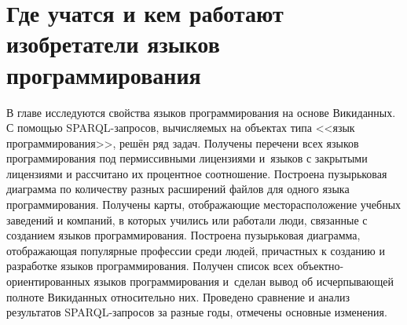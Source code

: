 \chapter{Где учатся и кем работают изобретатели языков программирования}
\label{ch:programming languages}

В главе исследуются свойства языков программирования на основе Викиданных. 
С помощью SPARQL-запросов, вычисляемых на объектах типа <<язык программирования>>, решён ряд задач. 
Получены перечени всех языков программирования под пермиссивными лицензиями 
и~языков с закрытыми лицензиями и рассчитано их процентное соотношение. 
Построена пузырьковая диаграмма по количеству разных расширений файлов для одного языка программирования. 
Получены карты, отображающие месторасположение учебных заведений и компаний, 
в которых учились или работали люди, связанные с созданием языков программирования. 
Построена пузырьковая диаграмма, отображающая популярные профессии среди людей, 
причастных к созданию и разработке языков программирования. 
Получен список всех объектно-ориентированных языков программирования 
и~сделан вывод об исчерпывающей полноте Викиданных относительно них. 
Проведено сравнение и анализ результатов SPARQL-запросов за разные годы, отмечены основные изменения. 

